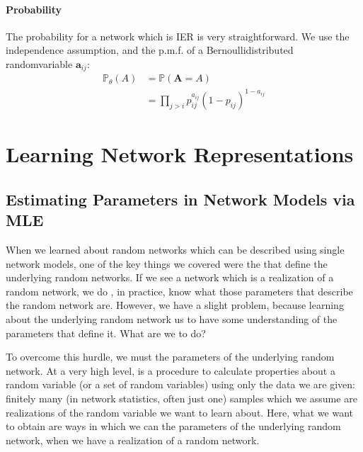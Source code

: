 \documentclass[letterpaper,10pt,english]{jupyterBook}
\begin{document}
\subsubsection{Probability}
\label{\detokenize{representations/ch5/single-network-models_theory:id6}}
\sphinxAtStartPar
The probability for a network which is IER is very straightforward. We use the independence assumption, and the p.m.f. of a Bernoulli\sphinxhyphen{}distributed random\sphinxhyphen{}variable \(\mathbf a_{ij}\):
\begin{align*}
    \mathbb P_\theta(A) &= \mathbb P(\mathbf A = A) \\
    &= \prod_{j > i}p_{ij}^{a_{ij}}(1 - p_{ij})^{1 - a_{ij}}
\end{align*}

\chapter{Learning Network Representations}
\label{\detokenize{representations/ch6/ch6:learning-network-representations}}\label{\detokenize{representations/ch6/ch6::doc}}

\section{Estimating Parameters in Network Models via MLE}
\label{\detokenize{representations/ch6/estimating-parameters_mle:estimating-parameters-in-network-models-via-mle}}\label{\detokenize{representations/ch6/estimating-parameters_mle::doc}}
\sphinxAtStartPar
When we learned about random networks which can be described using single network models, one of the key things we covered were the  that define the underlying random networks. If we see a network which is a realization of a random network, we do , in practice, know what those parameters that describe the random network are. However, we have a slight problem, because learning about the underlying random network  us to have some understanding of the parameters that define it. What are we to do?

\sphinxAtStartPar
To overcome this hurdle, we must  the parameters of the underlying random network. At a very high level,  is a procedure to calculate properties about a random variable (or a set of random variables) using only the data we are given: finitely many (in network statistics, often just one) samples which we assume are realizations of the random variable we want to learn about. Here, what we want to obtain are ways in which we can  the parameters of the underlying random network, when we have a realization of a random network.
\end{document}
